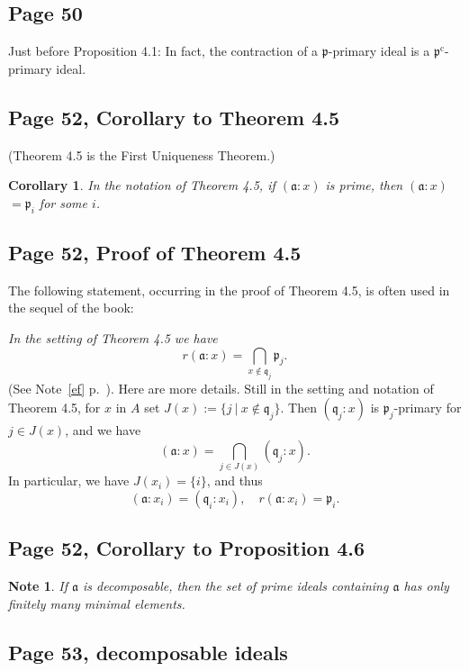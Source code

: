 \documentclass[parskip=half,fontsize=12pt]{scrartcl}%
\newcommand{\oo}{\operatorname}\newcommand{\ooo}{\operatorname*}
\newcommand{\mf}{\mathfrak}
\newcommand{\aaa}{\mf a}
\newcommand{\ppp}{\mf p}
\newcommand{\qqq}{\mf q}
\newtheorem{cor}[thm]{Corollary}
\newtheorem{note}[thm]{Note}
\begin{document}
\subsection{Page 50}\label{contrpry}%

Just before Proposition 4.1: In fact, the contraction of a $\ppp$-primary ideal is a $\ppp^{\oo c}$-primary ideal.

\subsection{Page 52, Corollary to Theorem 4.5}%

(Theorem 4.5 is the First Uniqueness Theorem.)
\begin{cor}\label{c45}
In the notation of Theorem 4.5, if %
$(\aaa:x)$ is prime, then $(\aaa:x)$ $=\ppp_i$ for some $i$. %
\end{cor}

\subsection{Page 52, Proof of Theorem 4.5}%

The following statement, occurring in the proof of Theorem 4.5, is often used in the sequel of the book:

{\em In the setting of Theorem 4.5 we have} 
\begin{equation}\label{45}
r(\aaa:x)=\bigcap_{x\notin\qqq_j}\ppp_j.
\end{equation}
(See Note~\ref{ef} p.~\pageref{ef}). Here are more details. Still in the setting and notation of Theorem 4.5, for $x$ in $A$ set $J(x):=\{j\ |\ x\notin\qqq_j\}$. Then $(\qqq_j:x)$ is $\ppp_j$-primary for $j\in J(x)$, and we have 
$$
(\aaa:x)=\bigcap_{j\in J(x)}(\qqq_j:x).
$$ 
In particular, we have $J(x_i)=\{i\}$, and thus 
$$
(\aaa:x_i)=(\qqq_i:x_i),\quad r(\aaa:x_i)=\ppp_i.
$$

\subsection{Page 52, Corollary to Proposition 4.6}%

\begin{note}\label{fmme}
If $\aaa$ is decomposable, then the set of prime ideals containing $\aaa$ has only finitely many minimal elements.
\end{note}

\subsection{Page 53, decomposable ideals}\label{di}%
\end{document}
